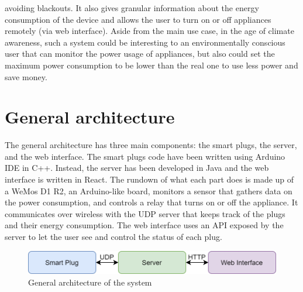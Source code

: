 \documentclass[conference]{IEEEtran}
\begin{document}
avoiding blackouts. It also gives granular information about the energy consumption of the device and allows the user to turn on or off appliances remotely (via web interface). Aside from the main use case, in the age of climate awareness, such a system could be interesting to an environmentally conscious user that can monitor the power usage of appliances, but also could set the maximum power consumption to be lower than the real one to use less power and save money. 
	
	\section{General architecture}
	The general architecture has three main components: the smart plugs, the server, and the web interface. The smart plugs code have been written using Arduino IDE in C++. Instead, the server has been developed in Java and the web interface is written in React. The rundown of what each part does is made up of a WeMos D1 R2, an Arduino-like board, monitors a sensor that gathers data on the power consumption, and controls a relay that turns on or off the appliance. It communicates over wireless with the UDP server that keeps track of the plugs and their energy consumption. The web interface uses an API exposed by the server to let the user see and control the status of each plug.
	\begin{figure}[htbp]
		\centering
		\includegraphics[width=\linewidth]{assets/architecture_schema}
		\caption{General architecture of the system}
		\label{fig:architecture_schema}
	\end{figure}
	
\end{document}
